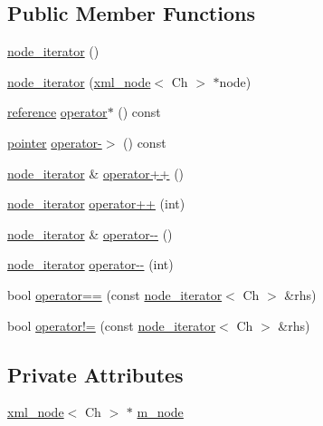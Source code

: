 \subsection*{Public Member Functions}
\begin{DoxyCompactItemize}
\item 
\hyperlink{classrapidxml_1_1node__iterator_a4e1244b9e9e1d2b5129235806d1e31ad}{node\+\_\+iterator} ()
\item 
\hyperlink{classrapidxml_1_1node__iterator_a94c3da59b54e4bd003e226cc35b3c266}{node\+\_\+iterator} (\hyperlink{classrapidxml_1_1xml__node}{xml\+\_\+node}$<$ Ch $>$ $\ast$node)
\item 
\hyperlink{classrapidxml_1_1node__iterator_ad7fabbcb7d3d9e4e220299c5475b9e9c}{reference} \hyperlink{classrapidxml_1_1node__iterator_ab31fe5bc1fd01fee8a2b31c3e42d78ed}{operator$\ast$} () const 
\item 
\hyperlink{classrapidxml_1_1node__iterator_a65dca8bca2b9c29f635b9ad0bdeeecb9}{pointer} \hyperlink{classrapidxml_1_1node__iterator_a9b3e7d58c4a628524914932e0663ddfb}{operator-\/$>$} () const 
\item 
\hyperlink{classrapidxml_1_1node__iterator}{node\+\_\+iterator} \& \hyperlink{classrapidxml_1_1node__iterator_a8d6b184a76b2ec8a8b5e90bc013c80ed}{operator++} ()
\item 
\hyperlink{classrapidxml_1_1node__iterator}{node\+\_\+iterator} \hyperlink{classrapidxml_1_1node__iterator_ad01b4e43e348a330984833fd4924d0f2}{operator++} (int)
\item 
\hyperlink{classrapidxml_1_1node__iterator}{node\+\_\+iterator} \& \hyperlink{classrapidxml_1_1node__iterator_ace52107ecd1bcf02e49619e86206e3a3}{operator-\/-\/} ()
\item 
\hyperlink{classrapidxml_1_1node__iterator}{node\+\_\+iterator} \hyperlink{classrapidxml_1_1node__iterator_a4ca35716bb7865f199a137b063af6080}{operator-\/-\/} (int)
\item 
bool \hyperlink{classrapidxml_1_1node__iterator_a5cb8a3b0d65a1a2517995e986a4debfd}{operator==} (const \hyperlink{classrapidxml_1_1node__iterator}{node\+\_\+iterator}$<$ Ch $>$ \&rhs)
\item 
bool \hyperlink{classrapidxml_1_1node__iterator_a20f1e25347d7e3856694f18597f7c8e2}{operator!=} (const \hyperlink{classrapidxml_1_1node__iterator}{node\+\_\+iterator}$<$ Ch $>$ \&rhs)
\end{DoxyCompactItemize}
\subsection*{Private Attributes}
\begin{DoxyCompactItemize}
\item 
\hyperlink{classrapidxml_1_1xml__node}{xml\+\_\+node}$<$ Ch $>$ $\ast$ \hyperlink{classrapidxml_1_1node__iterator_adeb3cd87d8ea08aa56d14166146fa291}{m\+\_\+node}
\end{DoxyCompactItemize}


